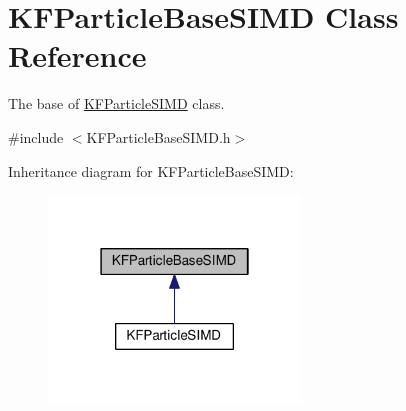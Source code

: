 \hypertarget{classKFParticleBaseSIMD}{}\section{K\+F\+Particle\+Base\+S\+I\+MD Class Reference}
\label{classKFParticleBaseSIMD}


The base of \hyperlink{classKFParticleSIMD}{K\+F\+Particle\+S\+I\+MD} class.  




{\ttfamily \#include $<$K\+F\+Particle\+Base\+S\+I\+M\+D.\+h$>$}



Inheritance diagram for K\+F\+Particle\+Base\+S\+I\+MD\+:
\nopagebreak
\begin{figure}[H]
\begin{center}
\leavevmode
\includegraphics[width=190pt]{classKFParticleBaseSIMD__inherit__graph}
\end{center}
\end{figure}
